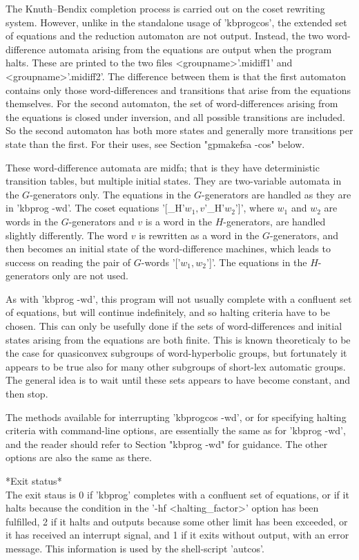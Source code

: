 The Knuth--Bendix completion process is carried out on the coset rewriting
system.
However, unlike in the standalone usage of 'kbprogcos', the extended set of
equations and the reduction automaton are not output. Instead, the two
word-difference automata arising from the equations are output when the program
halts. These are printed to the two files <groupname>'.midiff1' and
<groupname>'.midiff2'. The difference between them is that the first automaton
contains only those word-differences and transitions that arise from the
equations themselves. For the second automaton, the set of word-differences
arising from the equations is closed under inversion, and all possible
transitions are included. So the second automaton has both more states and
generally more transitions per state than the first. For their uses, see
Section "gpmakefsa -cos" below.

These word-difference automata are midfa; that is they have deterministic
transition tables, but multiple initial states. They are two-variable automata
in the $G$-generators only. The equations in the $G$-generators are
handled as they are in 'kbprog -wd'. The coset equations
'[\_H'$w_1,v$'\_H'$w_2$']', where $w_1$ and $w_2$ are words in the
$G$-generators and $v$ is a word in the $H$-generators, are handled slightly
differently. The word $v$ is rewritten as a word in the $G$-generators, and
then becomes an initial state of the word-difference machines, which leads
to success on reading the pair of $G$-words '['$w_1,w_2$']'. The equations
in the $H$-generators only are not used. 

As with 'kbprog -wd', this program will not usually complete with a
confluent set of equations, but will continue indefinitely, and so halting
criteria have to be chosen. This can only be usefully done if the sets of
word-differences and initial states arising from the equations are both
finite. This is known theoreticaly to be the case for quasiconvex subgroups
of word-hyperbolic groups, but fortunately it appears to be true also
for many other subgroups of short-lex automatic groups.
The general idea is to wait until these sets appears to have become constant,
and then stop.

The methods available for interrupting 'kbprogcos -wd', or for specifying
halting criteria with command-line options, are essentially the same as for
'kbprog -wd', and the reader should refer to Section "kbprog -wd" for guidance.
The other options are also the same as there.

*Exit status*\\
The exit staus is 0 if 'kbprog' completes with a confluent set of equations,
or if it halts because the condition in the '-hf <halting\_factor>' option
has been fulfilled,
2 if it halts and outputs because some other limit has
been exceeded, or it has received an interrupt signal, and 1 if it exits
without output, with an error message.
This information is used by the shell-script 'autcos'.

